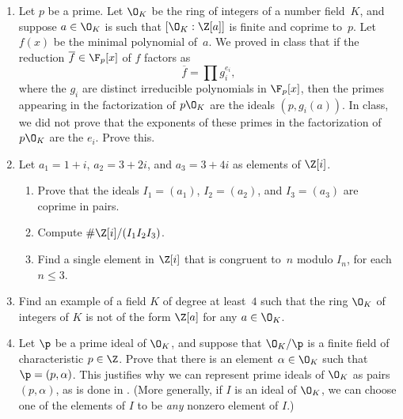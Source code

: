 \begin{enumerate}



\item Let $p$ be a prime.  Let $\O_K$ be the ring of integers of a
  number field~$K$, and suppose $a\in \O_K$ is such that
  $[\O_K:\Z[a]]$ is finite and coprime to~$p$.  Let $f(x)$ be the
  minimal polynomial of~$a$.  We proved in class 
that if the reduction $\overline{f}\in\F_p[x]$ of $f$ factors
as 
$$
 \overline{f} = \prod g_i^{e_i},
$$
where the $g_i$ are distinct irreducible polynomials in $\F_p[x]$, then the primes appearing
in the factorization of $p\O_K$ are the ideals $(p,g_i(a))$.
In class, we did not prove that the exponents of these primes in the factorization
of $p\O_K$ are the $e_i$.  Prove this.

\item Let $a_1 = 1+i$, $a_2 = 3+2i$, and $a_3 = 3+4i$ as elements of 
$\Z[i]$. 
\begin{enumerate}
\item Prove that the ideals $I_1=(a_1)$, $I_2=(a_2)$, and $I_3=(a_3)$
are coprime in pairs.
\item Compute $\#\Z[i]/(I_1 I_2 I_3)$.
\item Find a single element in $\Z[i]$ that is congruent to~$n$ modulo $I_n$, 
for each $n\leq 3$.
\end{enumerate}

\item Find an example of a field $K$ of degree at least~$4$ such that the ring
  $\O_K$ of integers of $K$ is not of the form $\Z[a]$ for any $a\in \O_K$.

\item Let $\p$ be a prime ideal of $\O_K$, and suppose that $\O_K/\p$
  is a finite field of characteristic $p\in\Z$.  Prove that there is
  an element $\alpha\in\O_K$ such that $\p=(p,\alpha)$.  This
  justifies why we can represent prime ideals of $\O_K$ as pairs
  $(p,\alpha)$, as is done in \sage.  (More generally, if $I$ is an
  ideal of $\O_K$, we can choose one of the elements of $I$ to be {\em
    any} nonzero element of $I$.)


\end{enumerate}
